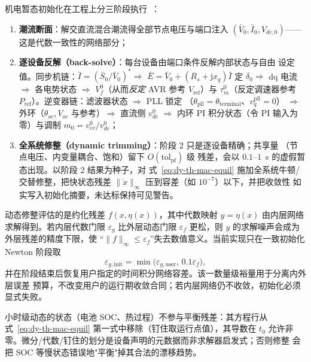 机电暂态初始化在工程上分三阶段执行~\cite{dym:milano}：
\begin{enumerate}
  \item \textbf{潮流断面}：解交直流混合潮流得全部节点电压与端口注入
        $(\bar V_0,\bar I_0,V_{dc,0})$——这是代数一致性的网络部分；
  \item \textbf{逐设备反解（back-solve）}：每台设备由端口条件反解内部状态与自由
        设定值。同步机链：$\bar I=(\bar S_0/\bar V_0)^{*}\Rightarrow$
        $\bar E=\bar V_0+(R_s+\mathrm jx_q)\bar I$ 定 $\delta_0\Rightarrow$
        dq 电流 $\Rightarrow$ 各电势状态 $\Rightarrow$ $V_f^0$（从而\emph{反定}
        AVR 参考 $V_{\mathrm{ref}}$）与 $\tau_m^0$（反定调速器参考
        $P_{\mathrm{ref}}$）。逆变器链：滤波器状态 $\Rightarrow$ PLL 锁定
        （$\theta_{\mathrm{pll}}=\theta_{\mathrm{terminal}}$、$v_q^{\mathrm{pll}}=0$）
        $\Rightarrow$ 外环（$\theta_{oc},V_{oc}$ 与参考）$\Rightarrow$ 直流侧
        $v_{dc}^0$ $\Rightarrow$ 内环 PI 积分状态（令 PI 输入为零）与调制
        $m_0=v_{cv}^0/v_{dc}^0$；
  \item \textbf{全系统修整（dynamic trimming）}：阶段 2 只是逐设备精确；共享量
        （节点电压、内变量耦合、饱和）留下 $O(\mathrm{tol}_{\mathrm{pf}})$ 级
        残差，会以 $0.1$--$1$~s 的虚假暂态出现。以阶段 2 结果为种子，对
        式~\eqref{eq:dy-th-mac-equil} 施加全系统牛顿/交替修整，把快状态残差
        $\lVert\dot x\rVert_\infty$ 压到容差（如 $10^{-7}$）以下，并把收敛性
        如实写入初始化摘要，未达标保持可见警告。
\end{enumerate}

\begin{remark}[一致初始化的嵌套容差预算]\label{rem:dy-th-mac-init-tolerance}
动态修整评估的是约化残差 $f(x,\eta(x))$，其中代数映射
$y=\eta(x)$ 由内层网络求解得到。若内层代数门限 $\varepsilon_{g}$ 比外层动态门限
$\varepsilon_{f}$ 更松，则 $y$ 的求解噪声会成为外层残差的精度下限，使
``$\lVert f\rVert_\infty\le\varepsilon_f$''失去数值意义。当前实现只在一致初始化
Newton 阶段取
\begin{equation}
 \varepsilon_{g,\mathrm{init}}
 =\min\bigl(\varepsilon_{g,\mathrm{user}},\,0.1\varepsilon_f\bigr),
 \label{eq:dy-th-mac-init-tolerance}
\end{equation}
并在阶段结束后恢复用户指定的时间积分网络容差。该一数量级裕量用于分离内外层误差
预算，不改变用户的运行期收敛合同；若内层网络仍不收敛，初始化必须显式失败。
\end{remark}

\begin{remark}[慢状态钉住]\label{rem:dy-th-mac-slowpin}
小时级动态的状态（电池 SOC、热过程）不参与平衡残差：其方程行从
式~\eqref{eq:dy-th-mac-equil} 第一式中移除（钉住取运行点值），其导数在 $t_0$
允许非零。微分/代数/钉住的划分是设备声明的元数据而非求解器启发式；否则修整
会把 SOC 等慢状态错误地"平衡"掉其合法的漂移趋势。
\end{remark}

